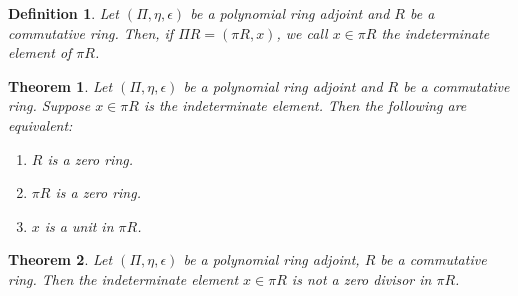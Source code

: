 \documentclass[12pt]{article}
\newtheorem{defn}{Definition}
\newtheorem{thm}{Theorem}
\begin{document}
\begin{defn}
  Let $(\Pi,\eta,\epsilon)$ be a polynomial ring adjoint and $R$ be a commutative ring. Then, if $\Pi R = (\pi R, x)$, we call $x \in \pi R$ the indeterminate element
  of $\pi R$. 
\end{defn}
\begin{thm}
  Let $(\Pi,\eta,\epsilon)$ be a polynomial ring adjoint and $R$ be a commutative ring. Suppose $x\in\pi R$ is the indeterminate element. 
  Then the following are equivalent:
  \begin{enumerate}
    \item $R$ is a zero ring.
    \item $\pi R$ is a zero ring.
    \item $x$ is a unit in $\pi R$.
  \end{enumerate}
\end{thm}
\begin{thm}
  Let $(\Pi,\eta,\epsilon)$ be a polynomial ring adjoint, $R$ be a commutative ring. Then the indeterminate element $x\in\pi R$ is not a zero divisor in $\pi R$.
\end{thm}
\end{document}
